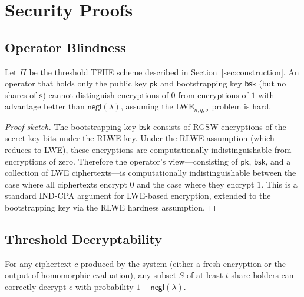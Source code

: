 \section{Security Proofs}

\label{sec:security}

\subsection{Operator Blindness}

\begin{theorem}
\label{thm:operator-blind}
Let $\Pi$ be the threshold TFHE scheme described in
Section~\ref{sec:construction}.  An operator that holds only the public
key $\mathsf{pk}$ and bootstrapping key $\mathsf{bsk}$ (but no shares
of $\mathbf{s}$) cannot distinguish encryptions of $0$ from encryptions
of $1$ with advantage better than $\mathsf{negl}(\lambda)$, assuming
the LWE$_{n,q,\sigma}$ problem is hard.
\end{theorem}

\begin{proof}[Proof sketch]
The bootstrapping key $\mathsf{bsk}$ consists of RGSW encryptions of
the secret key bits under the RLWE key.  Under the RLWE assumption
(which reduces to LWE), these encryptions are computationally
indistinguishable from encryptions of zero.  Therefore the operator's
view---consisting of $\mathsf{pk}$, $\mathsf{bsk}$, and a collection
of LWE ciphertexts---is computationally indistinguishable between the
case where all ciphertexts encrypt $0$ and the case where they encrypt
$1$.  This is a standard IND-CPA argument for LWE-based encryption,
extended to the bootstrapping key via the RLWE hardness assumption.
\end{proof}

\subsection{Threshold Decryptability}

\begin{theorem}
\label{thm:threshold-decrypt}
For any ciphertext $c$ produced by the system (either a fresh encryption
or the output of homomorphic evaluation), any subset $S$ of at least $t$
share-holders can correctly decrypt $c$ with probability
$1 - \mathsf{negl}(\lambda)$.
\end{theorem}


